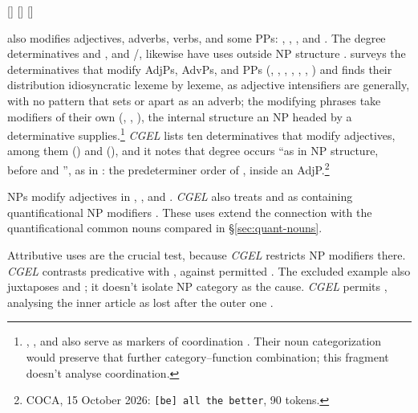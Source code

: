 \documentclass[12pt]{article}
\begin{document}
\ea\label{ex:temporal-adjp}
\ea {} [] 
\ex {} []  [] 
\z\z

 also modifies adjectives, adverbs, verbs, and some PPs: , , , and  \citep[396--397]{huddleston2002}. The degree determinatives  and , and /, likewise have uses outside NP structure \citep[390, 395--397]{huddleston2002}. \textcite{reynolds2024why} surveys the determinatives that modify AdjPs, AdvPs, and PPs (, , , , , , ) and finds their distribution idiosyncratic lexeme by lexeme, as adjective intensifiers are generally, with no pattern that sets  or  apart as an adverb; the modifying phrases take modifiers of their own (, , ), the internal structure an NP headed by a determinative supplies.\footnote{, , and  also serve as markers of coordination \citep[1305, 1308]{huddleston2002}. Their noun categorization would preserve that further category--function combination; this fragment doesn't analyse coordination.} \textit{CGEL} lists ten determinatives that modify adjectives, among them  () and  (), and it notes that degree  occurs \enquote{as in NP structure, before  and }, as in  \citep[549]{huddleston2002}: the predeterminer order of , inside an AdjP.\footnote{COCA, 15 October 2026: \texttt{[be] all the better}, 90 tokens.}

NPs modify adjectives in , , and . \textit{CGEL} also treats  and  as containing quantificational NP modifiers \citep[549--550]{huddleston2002}. These uses extend the connection with the quantificational common nouns compared in §\ref{sec:quant-nouns}.

Attributive uses are the crucial test, because \textit{CGEL} restricts NP modifiers there. \textit{CGEL} contrasts predicative  with , against permitted  \citep[551--552]{huddleston2002}. The excluded example also juxtaposes  and ; it doesn't isolate NP category as the cause. \textit{CGEL} permits , analysing the inner article as lost after the outer one \citep[p.~552, n.~8]{huddleston2002}.
\end{document}
